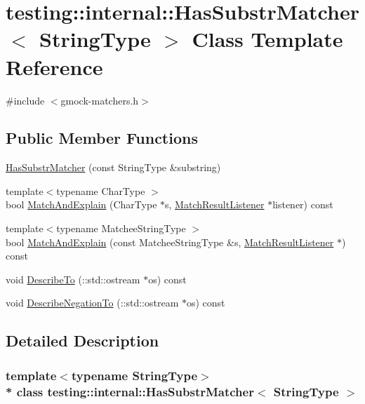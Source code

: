 \hypertarget{classtesting_1_1internal_1_1_has_substr_matcher}{}\section{testing\+:\+:internal\+:\+:Has\+Substr\+Matcher$<$ String\+Type $>$ Class Template Reference}
\label{classtesting_1_1internal_1_1_has_substr_matcher}


{\ttfamily \#include $<$gmock-\/matchers.\+h$>$}

\subsection*{Public Member Functions}
\begin{DoxyCompactItemize}
\item 
\hyperlink{classtesting_1_1internal_1_1_has_substr_matcher_a395efacb13a89e5010b9ec4a00a16f00}{Has\+Substr\+Matcher} (const String\+Type \&substring)
\item 
{\footnotesize template$<$typename Char\+Type $>$ }\\bool \hyperlink{classtesting_1_1internal_1_1_has_substr_matcher_ad90e57bd432f85cd87176af75f619033}{Match\+And\+Explain} (Char\+Type $\ast$s, \hyperlink{classtesting_1_1_match_result_listener}{Match\+Result\+Listener} $\ast$listener) const 
\item 
{\footnotesize template$<$typename Matchee\+String\+Type $>$ }\\bool \hyperlink{classtesting_1_1internal_1_1_has_substr_matcher_a21dac1edd2a99fc2dfc4ca8aca2f97c0}{Match\+And\+Explain} (const Matchee\+String\+Type \&s, \hyperlink{classtesting_1_1_match_result_listener}{Match\+Result\+Listener} $\ast$) const 
\item 
void \hyperlink{classtesting_1_1internal_1_1_has_substr_matcher_a146354dde4ae94f86a129493d178ec89}{Describe\+To} (\+::std\+::ostream $\ast$os) const 
\item 
void \hyperlink{classtesting_1_1internal_1_1_has_substr_matcher_a4af9583dc41ae2a13ab3ff488d4dcbaf}{Describe\+Negation\+To} (\+::std\+::ostream $\ast$os) const 
\end{DoxyCompactItemize}


\subsection{Detailed Description}
\subsubsection*{template$<$typename String\+Type$>$\\*
class testing\+::internal\+::\+Has\+Substr\+Matcher$<$ String\+Type $>$}



